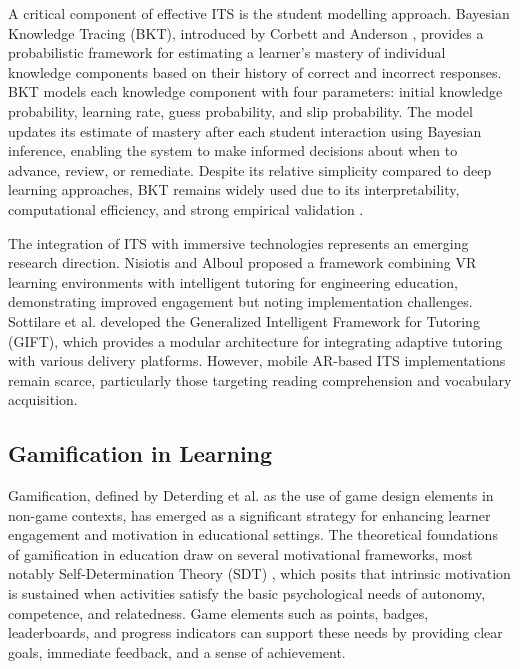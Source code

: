 A critical component of effective ITS is the student modelling approach. Bayesian Knowledge Tracing (BKT), introduced by Corbett and Anderson \cite{corbett1994}, provides a probabilistic framework for estimating a learner's mastery of individual knowledge components based on their history of correct and incorrect responses. BKT models each knowledge component with four parameters: initial knowledge probability, learning rate, guess probability, and slip probability. The model updates its estimate of mastery after each student interaction using Bayesian inference, enabling the system to make informed decisions about when to advance, review, or remediate. Despite its relative simplicity compared to deep learning approaches, BKT remains widely used due to its interpretability, computational efficiency, and strong empirical validation \cite{du2020}.

The integration of ITS with immersive technologies represents an emerging research direction. Nisiotis and Alboul \cite{nisiotis2021} proposed a framework combining VR learning environments with intelligent tutoring for engineering education, demonstrating improved engagement but noting implementation challenges. Sottilare et al. \cite{sottilare2018} developed the Generalized Intelligent Framework for Tutoring (GIFT), which provides a modular architecture for integrating adaptive tutoring with various delivery platforms. However, mobile AR-based ITS implementations remain scarce, particularly those targeting reading comprehension and vocabulary acquisition.

\subsection{Gamification in Learning}
\label{subsec:gamification}

Gamification, defined by Deterding et al. \cite{deterding2011} as the use of game design elements in non-game contexts, has emerged as a significant strategy for enhancing learner engagement and motivation in educational settings. The theoretical foundations of gamification in education draw on several motivational frameworks, most notably Self-Determination Theory (SDT) \cite{ryan2000}, which posits that intrinsic motivation is sustained when activities satisfy the basic psychological needs of autonomy, competence, and relatedness. Game elements such as points, badges, leaderboards, and progress indicators can support these needs by providing clear goals, immediate feedback, and a sense of achievement.

